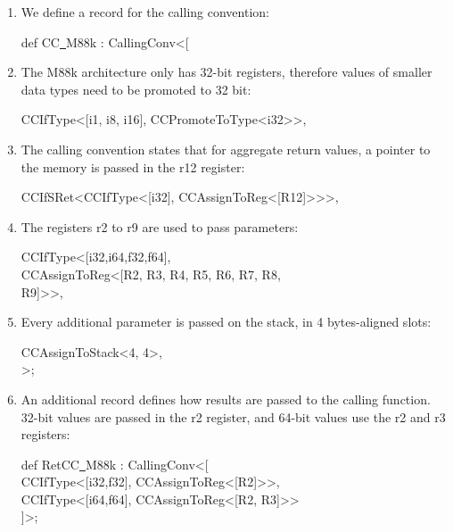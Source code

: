 \begin{enumerate}
\item We define a record for the calling convention:
\begin{tcolorbox}[colback=white,colframe=black]
def CC\underline{~}M88k : CallingConv<[
\end{tcolorbox}

\item The M88k architecture only has 32-bit registers, therefore values of smaller data types need to be promoted to 32 bit:
\begin{tcolorbox}[colback=white,colframe=black]
\hspace*{0.5cm}CCIfType<[i1, i8, i16], CCPromoteToType<i32>>,
\end{tcolorbox}

\item The calling convention states that for aggregate return values, a pointer to the memory is passed in the r12 register:
\begin{tcolorbox}[colback=white,colframe=black]
\hspace*{0.5cm}CCIfSRet<CCIfType<[i32], CCAssignToReg<[R12]>>>,
\end{tcolorbox}

\item The registers r2 to r9 are used to pass parameters:
\begin{tcolorbox}[colback=white,colframe=black]
\hspace*{0.5cm}CCIfType<[i32,i64,f32,f64], \\
\hspace*{1cm}CCAssignToReg<[R2, R3, R4, R5, R6, R7, R8, \\
\hspace*{1.5cm}R9]>>, 
\end{tcolorbox}

\item Every additional parameter is passed on the stack, in 4 bytes-aligned slots:
\begin{tcolorbox}[colback=white,colframe=black]
\hspace*{0.5cm}CCAssignToStack<4, 4>, \\
>;
\end{tcolorbox}

\item An additional record defines how results are passed to the calling function. 32-bit values are passed in the r2 register, and 64-bit values use the r2 and r3 registers:
\begin{tcolorbox}[colback=white,colframe=black]
def RetCC\underline{~}M88k : CallingConv<[ \\
\hspace*{0.5cm}CCIfType<[i32,f32], CCAssignToReg<[R2]>>, \\
\hspace*{0.5cm}CCIfType<[i64,f64], CCAssignToReg<[R2, R3]>> \\
]>;
\end{tcolorbox}


\end{enumerate}
